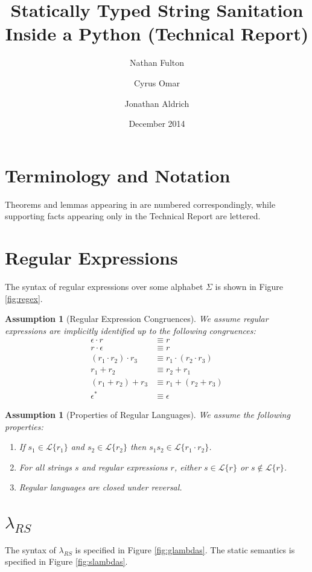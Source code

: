 \documentclass[11pt,leqno]{article}
\title{Statically Typed String Sanitation Inside a Python (Technical Report)}
\author{Nathan Fulton \and Cyrus Omar \and Jonathan Aldrich}
\date{December 2014}
\newtheorem{ass}[tr]{Assumption}
\theoremstyle{definition}
\newcommand{\Lagr}{\mathcal{L}}
\newcommand{\lang}[1]{\Lagr\{#1\}}
\newcommand{\lambdas}{\lambda_{RS}}
\begin{document}
\maketitle

\tableofcontents
\listoffigures
\clearpage


\section{Terminology and Notation}
Theorems and lemmas appearing in \cite{fulton2014} are numbered correspondingly, while supporting facts appearing only in the Technical Report are lettered.

\section{Regular Expressions}
The syntax of regular expressions over some alphabet $\Sigma$ is shown in Figure \ref{fig:regex}. 

\begin{ass}[Regular Expression Congruences]
We assume regular expressions are implicitly identified up to the following congruences:
\begin{align*}
\epsilon\cdot r & \equiv r\\
r \cdot \epsilon & \equiv r\\
(r_1\cdot r_2) \cdot r_3 & \equiv r_1 \cdot (r_2 \cdot r_3)\\
r_1 + r_2 &\equiv r_2 + r_1\\
(r_1 + r_2) + r_3 &\equiv r_1 + (r_2 + r_3)\\
\epsilon^* & \equiv \epsilon
\end{align*}
\end{ass}

\begin{ass}[Properties of Regular Languages] \label{thm:regexprops}
We assume the following properties:
\begin{enumerate}

\item If $s_1 \in \lang{r_1}$ and $s_2 \in \lang{r_2}$ then $s_1s_2 \in \lang{r_1\cdot r_2}$.
\item For all strings $s$ and regular expressions $r$, either $s \in \lang{r}$ or $s \not \in \lang{r}$.
\item Regular languages are closed under reversal.
\end{enumerate}
\end{ass}

\section{$\lambdas$}
The syntax of $\lambdas$ is specified in Figure \ref{fig:glambdas}. The static semantics is specified in Figure \ref{fig:slambdas}.
\end{document}
